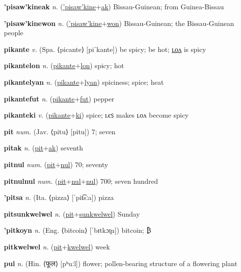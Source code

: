 \textbf{\hypertarget{'pisaw'kineak}{'pisaw'kineak}} \textit{n.} (\hyperlink{'pisaw'kine}{'pisaw'kine}+\allowbreak \hyperlink{ak}{ak})
Bissau-Guinean; from Guinea-Bissau

\textbf{\hypertarget{'pisaw'kinewon}{'pisaw'kinewon}} \textit{n.} (\hyperlink{'pisaw'kine}{'pisaw'kine}+\allowbreak \hyperlink{won}{won})
Bissau-Guinean; the Bissau-Guinean people

\textbf{\hypertarget{pikante}{pikante}} \textit{v.} (Spa. ⟨picante⟩ [piˈkante])
be spicy; be hot; \hyperlink{pikantelon}{ʟᴏᴧ} is spicy

\textbf{\hypertarget{pikantelon}{pikantelon}} \textit{n.} (\hyperlink{pikante}{pikante}+\allowbreak \hyperlink{lon}{lon})
spicy; hot

\textbf{\hypertarget{pikantelyan}{pikantelyan}} \textit{n.} (\hyperlink{pikante}{pikante}+\allowbreak \hyperlink{lyan}{lyan})
spiciness; spice; heat

\textbf{\hypertarget{pikantefut}{pikantefut}} \textit{n.} (\hyperlink{pikante}{pikante}+\allowbreak \hyperlink{fut}{fut})
pepper

\textbf{\hypertarget{pikanteki}{pikanteki}} \textit{v.} (\hyperlink{pikante}{pikante}+\allowbreak \hyperlink{ki}{ki})
spice; ʟєꜱ makes ʟᴏᴧ become spicy

\textbf{\hypertarget{pit}{pit}} \textit{num.} (Jav. ⟨pitu⟩ [pitu])
7; seven

\textbf{\hypertarget{pitak}{pitak}} \textit{n.} (\hyperlink{pit}{pit}+\allowbreak \hyperlink{ak}{ak})
seventh

\textbf{\hypertarget{pitnul}{pitnul}} \textit{num.} (\hyperlink{pit}{pit}+\allowbreak \hyperlink{nul}{nul})
70; seventy

\textbf{\hypertarget{pitnulnul}{pitnulnul}} \textit{num.} (\hyperlink{pit}{pit}+\allowbreak \hyperlink{nul}{nul}+\allowbreak \hyperlink{nul}{nul})
700; seven hundred

\textbf{\hypertarget{'pitsa}{'pitsa}} \textit{n.} (Ita. ⟨pizza⟩ [ˈpit͡sːa])
pizza

\textbf{\hypertarget{pitsunkwelwel}{pitsunkwelwel}} \textit{n.} (\hyperlink{pit}{pit}+\allowbreak \hyperlink{sunkwelwel}{sunkwelwel})
Sunday

\textbf{\hypertarget{'pitkoyn}{'pitkoyn}} \textit{n.} (Eng. ⟨bitcoin⟩ [ˈbɪtkɔɪ̯n])
bitcoin; ₿

\textbf{\hypertarget{pitkwelwel}{pitkwelwel}} \textit{n.} (\hyperlink{pit}{pit}+\allowbreak \hyperlink{kwelwel}{kwelwel})
week

\textbf{\hypertarget{pul}{pul}} \textit{n.} (Hin. ⟨{\devanagari{}फूल}⟩ [pʰuːl])
flower; pollen-bearing structure of a flowering plant

